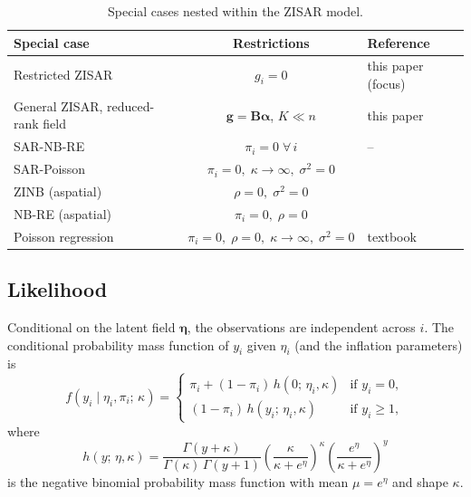 \begin{table}[htbp]
\centering
\caption{Special cases nested within the ZISAR model.}\label{tab:special_cases}
\footnotesize
\begin{tabular}{lcl}
\toprule
Special case & Restrictions & Reference \\
\midrule
Restricted ZISAR & $g_i = 0$ & this paper (focus) \\
General ZISAR, reduced-rank field & $\mathbf{g} = \mathbf{B}\boldsymbol{\alpha}$, $K \ll n$ & this paper \\
SAR-NB-RE & $\pi_i = 0\;\forall\,i$ & -- \\
SAR-Poisson & $\pi_i = 0,\;\kappa\to\infty,\;\sigma^2 = 0$ & \citet{lambert2010} \\
ZINB (aspatial) & $\rho = 0,\;\sigma^2 = 0$ & \citet{cameron_trivedi2013} \\
NB-RE (aspatial) & $\pi_i = 0,\;\rho = 0$ & \citet{mcculloch_searle2001} \\
Poisson regression & $\pi_i = 0,\;\rho = 0,\;\kappa\to\infty,\;\sigma^2 = 0$ & textbook \\
\bottomrule
\end{tabular}
\end{table}

\subsection{Likelihood}\label{sec:model_likelihood}

Conditional on the latent field $\boldsymbol{\eta}$, the observations are independent across $i$.
The conditional probability mass function of $y_i$ given $\eta_i$ (and the inflation parameters) is
\begin{equation}\label{eq:pmf}
  f(y_i \mid \eta_i, \pi_i;\,\kappa) =
  \begin{cases}
    \pi_i + (1-\pi_i)\,h(0;\,\eta_i,\kappa) & \text{if } y_i = 0, \\
    (1-\pi_i)\,h(y_i;\,\eta_i,\kappa) & \text{if } y_i \geq 1,
  \end{cases}
\end{equation}
where
\begin{equation}\label{eq:nb_pmf}
  h(y;\,\eta,\kappa) = \frac{\Gamma(y + \kappa)}{\Gamma(\kappa)\,\Gamma(y+1)}
  \left(\frac{\kappa}{\kappa+e^\eta}\right)^{\!\kappa}
  \left(\frac{e^\eta}{\kappa+e^\eta}\right)^{\!y}
\end{equation}
is the negative binomial probability mass function with mean $\mu = e^\eta$ and shape $\kappa$.

